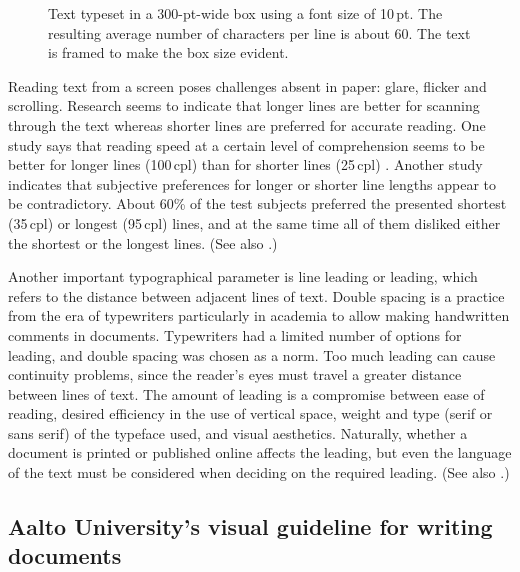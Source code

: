 \documentclass[english, 12pt, a4paper, elec, utf8, a-2b, online]{aaltothesis}
\begin{document}
\begin{figure}[b]
	\centering
	\caption{Text typeset in a 300-pt-wide box using a font size of 10\,pt. The 
		resulting average number of characters per line is about 60. The text is
		framed to make the box size evident.}
\end{figure}

Reading text from a screen poses challenges absent in paper: glare, flicker and 
scrolling. Research seems to indicate that longer lines are better for scanning 
through the text whereas shorter lines are preferred for accurate reading. One 
study says that reading speed at a certain level of comprehension seems to be 
better for longer lines (100\,cpl) than for shorter lines (25\,cpl) 
\cite{Dyson}. Another study \cite{Shaik} indicates that subjective preferences 
for longer or shorter line lengths appear to be contradictory. About 60\% of 
the test subjects preferred the presented shortest (35\,cpl) or longest 
(95\,cpl) lines, and at the same time all of them disliked either the 
shortest or the longest lines. (See also \cite{Wikilinelength}.)

Another important typographical parameter is line leading or leading, which 
refers to the distance between adjacent lines of text. Double spacing is a 
practice from the era of typewriters particularly in academia to allow making 
handwritten comments in documents. Typewriters had a limited number of options 
for leading, and double spacing was chosen as a norm. Too much leading can cause
continuity problems, since the reader’s eyes must travel a greater distance 
between lines of text. The amount of leading is a compromise between ease of 
reading, desired efficiency in the use of vertical space, weight and type (serif
or sans serif) of the typeface used, and visual aesthetics. Naturally, whether a
document is printed or published online affects the leading, but even the 
language of the text must be considered when deciding on the required leading. 
(See also \cite{enwiki:1026690618}.)

\subsection*{Aalto University’s visual guideline for writing documents}
\end{document}
